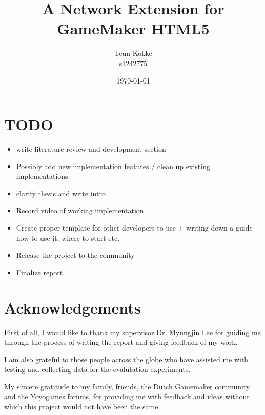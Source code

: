 \documentclass[bsc,frontabs,twoside,singlespacing,parskip,deptreport]{infthesis}     %
\begin{document}
\title{A Network Extension for GameMaker HTML5}

\author{Teun Kokke\\s1242775}

\date{\today}


\maketitle

\section*{TODO}
\begin{itemize}
\item write literature review and development section
\item Possibly add new implementation features / clean up existing implementations.
\item clarify thesis and write intro
\item Record video of working implementation
\item Create proper template for other developers to use + writing down a guide how to use it, where to start etc.
\item Release the project to the community
\item Finalize report
\end{itemize}

\pagebreak

\section*{Acknowledgements}
First of all, I would like to thank my supervisor Dr. Myungjin Lee for guiding me through the process of writing the report and giving feedback of my work.

I am also grateful to those people across the globe who have assisted me with testing and collecting data for the evalutation experiments.

My sincere gratitude to my family, friends, the Dutch Gamemaker community and the Yoyogames forums, for providing me with feedback and ideas without which this project would not have been the same.
\end{document}
